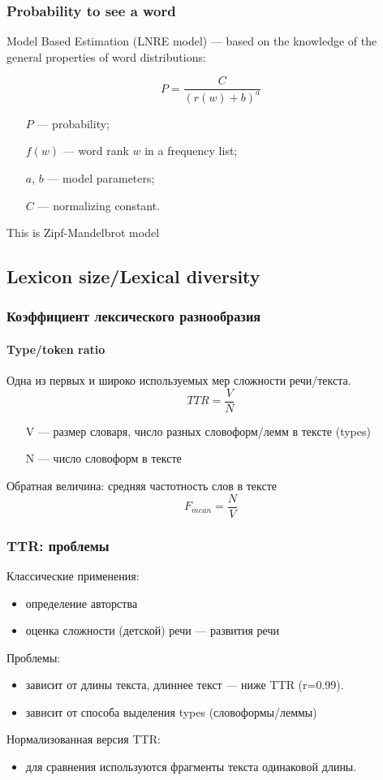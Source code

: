 \documentclass[svgnames]{beamer}
\begin{document}
\begin{frame}
  \frametitle{Probability to see a word}

  Model Based Estimation (LNRE model) — based on the knowledge of the
  general properties of word distributions:

  $$
  P = \frac{C}{(r(w) + b)^a}
  $$
  \begin{itemize}
  \item[$P$] — probability;
  \item[$f(w)$] — word rank $w$ in a frequency list;
  \item[$a$, $b$] — model parameters;
  \item[$C$] — normalizing constant.
  \end{itemize}

  This is Zipf-Mandelbrot model
\end{frame}

\subsection{Lexicon size/Lexical diversity}

\begin{frame}
  \frametitle{Коэффициент лексического разнообразия}
  \framesubtitle{Type/token ratio}
  Одна из первых и широко используемых мер сложности речи/текста.
  \begin{equation}
    TTR = \frac{V}{N}
  \end{equation}
  \begin{itemize}
  \item[V] — размер словаря, число разных словоформ/лемм в тексте (types)
  \item[N] — число словоформ в тексте
  \end{itemize}
  \pause
  Обратная величина: средняя частотность слов в тексте
  \begin{equation}
    F_{mean} = \frac{N}{V}
  \end{equation}
\end{frame}

\begin{frame}
  \frametitle{TTR: проблемы}
  Классические применения:
  \begin{itemize}
  \item определение авторства
  \item оценка сложности (детской) речи — развития речи
  \end{itemize}
  Проблемы:
  \begin{itemize}
  \item \alert{зависит от длины текста}, длиннее текст — ниже TTR (r=0.99).
  \item зависит от способа выделения types (словоформы/леммы)
  \end{itemize}
  Нормализованная версия TTR:
  \begin{itemize}
  \item для сравнения используются фрагменты текста одинаковой длины.
  \end{itemize}
\end{frame}
\end{document}
